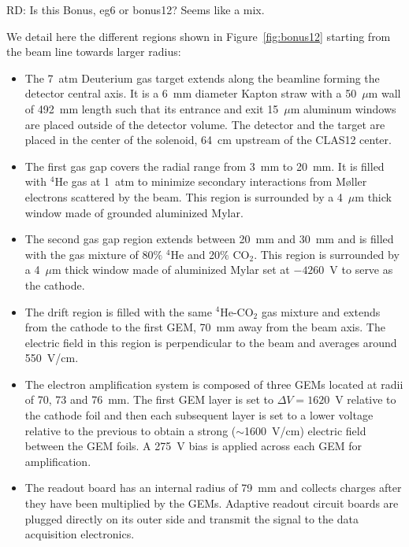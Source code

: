 RD: Is this Bonus, eg6 or bonus12? Seems like a mix.

We detail here the different regions shown in Figure~\ref{fig:bonus12} starting 
from the beam line towards larger radius:\\
\begin{itemize}
  \item The 7~atm Deuterium gas target extends along the beamline forming the 
     detector central axis. It is a 6~mm diameter Kapton straw with a 50~$\mu$m 
      wall of 492~mm length such that its entrance and exit 15~$\mu$m aluminum 
      windows are placed outside of the detector volume.  The detector and the 
      target are placed in the center of the solenoid, 64~cm upstream of the 
      CLAS12 center.
   \item The first gas gap covers the radial range from 3~mm to 20~mm. It is 
      filled with $^{4}$He gas at 1~atm to minimize secondary interactions from
      M\o{}ller electrons scattered by the beam. This region is surrounded by a 
      4~$\mu$m thick window made of grounded aluminized Mylar.
   \item The second gas gap region extends between 20~mm and 30~mm and is 
      filled with the gas mixture of 80$\%$ $^{4}$He and 20$\%$ CO$_2$. This 
      region is surrounded by a 4~$\mu$m thick window made of aluminized Mylar 
      set at $-4260$~V to serve as the cathode.
   \item The drift region is filled with the same $^4$He-CO$_2$ gas mixture and 
      extends from the cathode to the first GEM, 70~mm away from the beam axis.  
      The electric field in this region is perpendicular to the beam and 
      averages around 550~V/cm.
   \item The electron amplification system is composed of three GEMs located at 
      radii of 70, 73 and 76~mm. The first GEM layer is set to $\Delta 
      V=1620$~V relative to the cathode foil and then each subsequent layer is 
      set to a lower voltage relative to the previous to obtain a strong 
      ($\sim$1600~V/cm) electric field between the GEM foils. A 275~V bias is 
      applied across each GEM for amplification.
   \item The readout board has an internal radius of 79~mm and collects charges 
      after they have been multiplied by the GEMs. Adaptive readout circuit 
      boards are plugged directly on its outer side and transmit the signal to 
      the data acquisition electronics.
\end{itemize}



